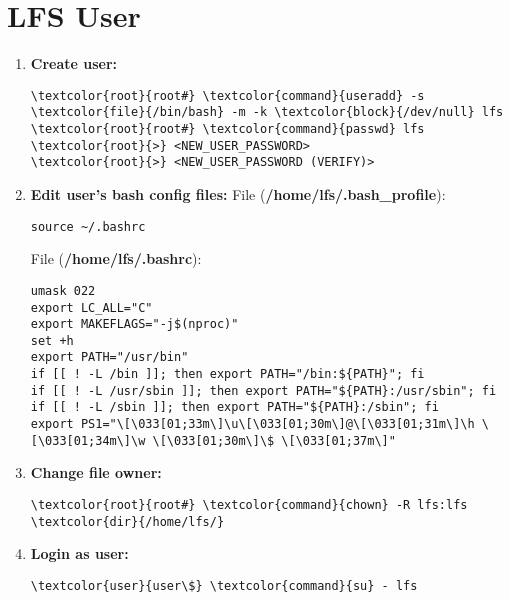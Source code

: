 \documentclass[10pt, a4paper, onecolumn, oneside, titlepage, openany]{book}
\begin{document}
\section{LFS User}
\begin{enumerate}
    \item \textbf{Create user:}
\begin{Verbatim}[commandchars=\\\{\}]
\textcolor{root}{root#} \textcolor{command}{useradd} -s \textcolor{file}{/bin/bash} -m -k \textcolor{block}{/dev/null} lfs
\textcolor{root}{root#} \textcolor{command}{passwd} lfs
\textcolor{root}{>} <NEW_USER_PASSWORD>
\textcolor{root}{>} <NEW_USER_PASSWORD (VERIFY)>
\end{Verbatim}
    \item \textbf{Edit user's bash config files:}
\newline File (\textbf{\textcolor{file}{/home/lfs/.bash\_profile}}):
\begin{lstlisting}[language=linux_file]
source ~/.bashrc
\end{lstlisting}
File (\textbf{\textcolor{file}{/home/lfs/.bashrc}}):
\begin{lstlisting}[language=linux_file]
umask 022
export LC_ALL="C"
export MAKEFLAGS="-j$(nproc)"
set +h
export PATH="/usr/bin"
if [[ ! -L /bin ]]; then export PATH="/bin:${PATH}"; fi
if [[ ! -L /usr/sbin ]]; then export PATH="${PATH}:/usr/sbin"; fi
if [[ ! -L /sbin ]]; then export PATH="${PATH}:/sbin"; fi
export PS1="\[\033[01;33m\]\u\[\033[01;30m\]@\[\033[01;31m\]\h \[\033[01;34m\]\w \[\033[01;30m\]\$ \[\033[01;37m\]"
\end{lstlisting}
    \item \textbf{Change file owner:}
\begin{Verbatim}[commandchars=\\\{\}]
\textcolor{root}{root#} \textcolor{command}{chown} -R lfs:lfs \textcolor{dir}{/home/lfs/}
\end{Verbatim}
    \item \textbf{Login as user:}
\begin{Verbatim}[commandchars=\\\{\}]
\textcolor{user}{user\$} \textcolor{command}{su} - lfs
\end{Verbatim}
\end{enumerate}
\end{document}

